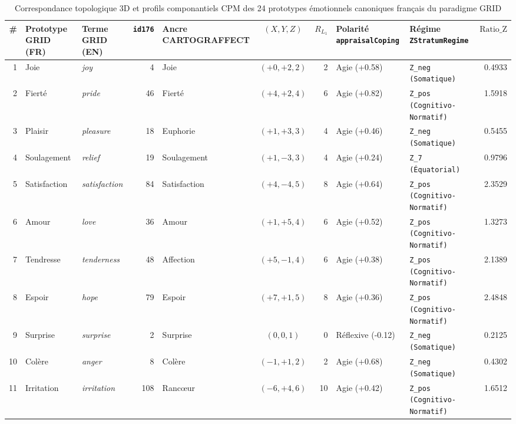 \begin{table}[htbp]
\centering
\begin{threeparttable}
\caption{Correspondance topologique 3D et profils componantiels CPM des 24 prototypes émotionnels canoniques français du paradigme GRID}
\label{tab:cartograffect_grid24_correspondence}
\footnotesize
\begin{tabular}{r l l r l c r l l r}
\toprule
\# & Prototype GRID (FR) & Terme GRID (EN) & \texttt{id176} & Ancre CARTOGRAFFECT & $(X, Y, Z)$ & $R_{L_1}$ & Polarité \texttt{appraisalCoping} & Régime \texttt{ZStratumRegime} & $\text{Ratio\_Z}$ \\
\midrule
1 & Joie & \textit{joy} & 4 & Joie & $(+0, +2, 2)$ & 2 & Agie (+0.58) & \texttt{Z\_neg (Somatique)} & 0.4933 \\
2 & Fierté & \textit{pride} & 46 & Fierté & $(+4, +2, 4)$ & 6 & Agie (+0.82) & \texttt{Z\_pos (Cognitivo-Normatif)} & 1.5918 \\
3 & Plaisir & \textit{pleasure} & 18 & Euphorie & $(+1, +3, 3)$ & 4 & Agie (+0.46) & \texttt{Z\_neg (Somatique)} & 0.5455 \\
4 & Soulagement & \textit{relief} & 19 & Soulagement & $(+1, -3, 3)$ & 4 & Agie (+0.24) & \texttt{Z\_7 (Équatorial)} & 0.9796 \\
5 & Satisfaction & \textit{satisfaction} & 84 & Satisfaction & $(+4, -4, 5)$ & 8 & Agie (+0.64) & \texttt{Z\_pos (Cognitivo-Normatif)} & 2.3529 \\
6 & Amour & \textit{love} & 36 & Amour & $(+1, +5, 4)$ & 6 & Agie (+0.52) & \texttt{Z\_pos (Cognitivo-Normatif)} & 1.3273 \\
7 & Tendresse & \textit{tenderness} & 48 & Affection & $(+5, -1, 4)$ & 6 & Agie (+0.38) & \texttt{Z\_pos (Cognitivo-Normatif)} & 2.1389 \\
8 & Espoir & \textit{hope} & 79 & Espoir & $(+7, +1, 5)$ & 8 & Agie (+0.36) & \texttt{Z\_pos (Cognitivo-Normatif)} & 2.4848 \\
9 & Surprise & \textit{surprise} & 2 & Surprise & $(0, 0, 1)$ & 0 & Réflexive (-0.12) & \texttt{Z\_neg (Somatique)} & 0.2125 \\
10 & Colère & \textit{anger} & 8 & Colère & $(-1, +1, 2)$ & 2 & Agie (+0.68) & \texttt{Z\_neg (Somatique)} & 0.4302 \\
11 & Irritation & \textit{irritation} & 108 & Rancœur & $(-6, +4, 6)$ & 10 & Agie (+0.42) & \texttt{Z\_pos (Cognitivo-Normatif)} & 1.6512 \\

\end{tabular}
\end{threeparttable}
\end{table}

